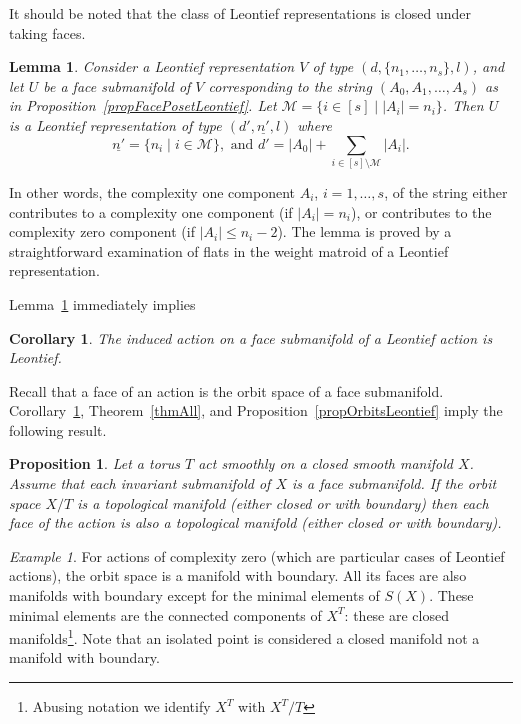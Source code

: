 \documentclass[english,12pt,oneside]{amsproc}
\newcommand{\ca}[1]{\mathcal{#1}}
\newcounter{stmcounter}[section]
\numberwithin{equation}{section}
\theoremstyle{plain}
\newtheorem{cor}[stmcounter]{Corollary}
\newtheorem{prop}[stmcounter]{Proposition}
\newtheorem{lem}[stmcounter]{Lemma}
\theoremstyle{definition}
\theoremstyle{remark}
\newtheorem{ex}[stmcounter]{Example}
\begin{document}
It should be noted that the class of Leontief representations is closed under taking faces.

\begin{lem}\label{lemFaceIsLeontief}
Consider a Leontief representation $V$ of type $(d,\{n_1,\ldots,n_s\},l)$, and let $U$ be a face submanifold of $V$ corresponding to the string $(A_0,A_1,\ldots,A_s)$ as in Proposition~\ref{propFacePosetLeontief}. Let $\ca{M}=\{i\in[s]\mid |A_i|=n_i\}$. Then $U$ is a Leontief representation of type $(d',\underline{n'},l)$ where
\[
\underline{n'}=\{n_i\mid i\in \ca{M}\},\text{ and } d'=|A_0|+\sum_{i\in[s]\setminus \ca{M}}|A_i|.
\]
\end{lem}

In other words, the complexity one component $A_i$, $i=1,\ldots,s$, of the string either contributes to a complexity one component (if $|A_i|=n_i$), or contributes to the complexity zero component (if $|A_i|\leqslant n_i-2$). The lemma is proved by a straightforward examination of flats in the weight matroid of a Leontief representation.

Lemma~\ref{lemFaceIsLeontief} immediately implies

\begin{cor}\label{corFaceIsLeontief}
The induced action on a face submanifold of a Leontief action is Leontief.
\end{cor}

Recall that a face of an action is the orbit space of a face submanifold. Corollary~\ref{corFaceIsLeontief}, Theorem~\ref{thmAll}, and Proposition~\ref{propOrbitsLeontief} imply the following result.

\begin{prop}\label{propMfdFaceMfd}
Let a torus $T$ act smoothly on a closed smooth manifold $X$. Assume that each invariant submanifold of $X$ is a face submanifold. If the orbit space $X/T$ is a topological manifold (either closed or with boundary) then each face of the action is also a topological manifold (either closed or with boundary).
\end{prop}

\begin{ex}
For actions of complexity zero (which are particular cases of Leontief actions), the orbit space is a manifold with boundary. All its faces are also manifolds with boundary except for the minimal elements of $S(X)$. These minimal elements are the connected components of $X^T$: these are closed manifolds\footnote{Abusing notation we identify $X^T$ with $X^T/T$}. Note that an isolated point is considered a closed manifold not a manifold with boundary.
\end{ex}
\end{document}
